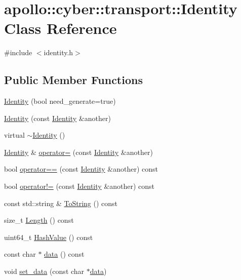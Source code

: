 \hypertarget{classapollo_1_1cyber_1_1transport_1_1Identity}{\section{apollo\-:\-:cyber\-:\-:transport\-:\-:Identity Class Reference}
\label{classapollo_1_1cyber_1_1transport_1_1Identity}
}


{\ttfamily \#include $<$identity.\-h$>$}

\subsection*{Public Member Functions}
\begin{DoxyCompactItemize}
\item 
\hyperlink{classapollo_1_1cyber_1_1transport_1_1Identity_a9a0538753eaccfbbc7a4e0769c633363}{Identity} (bool need\-\_\-generate=true)
\item 
\hyperlink{classapollo_1_1cyber_1_1transport_1_1Identity_a0bc1fd4be6f6e2f261fd7ae898f958b5}{Identity} (const \hyperlink{classapollo_1_1cyber_1_1transport_1_1Identity}{Identity} \&another)
\item 
virtual \hyperlink{classapollo_1_1cyber_1_1transport_1_1Identity_a74fa4459f582ad4da760654d03ef1cbd}{$\sim$\-Identity} ()
\item 
\hyperlink{classapollo_1_1cyber_1_1transport_1_1Identity}{Identity} \& \hyperlink{classapollo_1_1cyber_1_1transport_1_1Identity_a8356a20c8b878c5d577f841f2ce87591}{operator=} (const \hyperlink{classapollo_1_1cyber_1_1transport_1_1Identity}{Identity} \&another)
\item 
bool \hyperlink{classapollo_1_1cyber_1_1transport_1_1Identity_a59f528baf1c5b2f5712a64e2d98c422a}{operator==} (const \hyperlink{classapollo_1_1cyber_1_1transport_1_1Identity}{Identity} \&another) const 
\item 
bool \hyperlink{classapollo_1_1cyber_1_1transport_1_1Identity_a98e144c5fbbf44e82777e3978a660c08}{operator!=} (const \hyperlink{classapollo_1_1cyber_1_1transport_1_1Identity}{Identity} \&another) const 
\item 
const std\-::string \& \hyperlink{classapollo_1_1cyber_1_1transport_1_1Identity_a9271dd863859cbbfb335ca6a1530c758}{To\-String} () const 
\item 
size\-\_\-t \hyperlink{classapollo_1_1cyber_1_1transport_1_1Identity_a1b73edd4f6e7c5a24f5c78fd2aca8c6c}{Length} () const 
\item 
uint64\-\_\-t \hyperlink{classapollo_1_1cyber_1_1transport_1_1Identity_a2cf3af8ad55218c1b10d83d0ca6c5591}{Hash\-Value} () const 
\item 
const char $\ast$ \hyperlink{classapollo_1_1cyber_1_1transport_1_1Identity_ad991c250712f3c4af049e6ba29f26868}{data} () const 
\item 
void \hyperlink{classapollo_1_1cyber_1_1transport_1_1Identity_a89a4a7febc6d7d56be3b8be6326769a0}{set\-\_\-data} (const char $\ast$\hyperlink{classapollo_1_1cyber_1_1transport_1_1Identity_ad991c250712f3c4af049e6ba29f26868}{data})
\end{DoxyCompactItemize}
